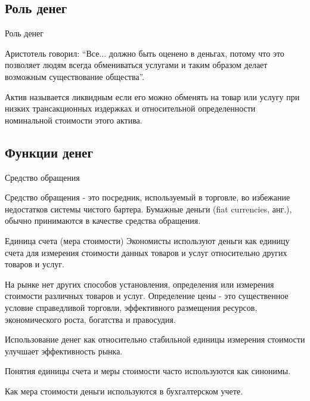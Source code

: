 \documentclass[_DKB_p1_Money.tex]{subfiles}
\begin{document}
\subsection{Роль денег}
\begin{frame}{Роль денег}
\begin{block}
\quad
Аристотель говорил: ``Все... должно быть оценено в деньгах, потому что это позволяет людям всегда обмениваться услугами и таким образом делает возможным существование общества''.
\end{block}
\begin{block}{Актив называется ликвидным}
\quad
если его можно обменять на товар или услугу при низких трансакционных издержках и относительной определенности номинальной стоимости этого актива.
\end{block}
\end{frame}

\subsection{Функции денег}

\begin{frame}{}
\begin{figure}
	\centering
	\begin{overprint}
	\end{overprint}
	\vspace*{-1.5em}
	\caption{}
\end{figure}
\end{frame}


\begin{frame}{Средство обращения }
\begin{block}{Средство обращения }
\quad
- это посредник, используемый в торговле, во избежание недостатков системы чистого бартера. Бумажные деньги (fiat currencies, анг.), обычно принимаются в качестве средства обращения. 
\end{block}
\end{frame}

\begin{frame}[shrink=10]{Единица счета (мера стоимости) }
Экономисты используют деньги как единицу счета для измерения стоимости данных товаров и услуг относительно других товаров и услуг.

На рынке нет других способов установления, определения или измерения стоимости различных товаров и услуг. Определение цены - это существенное условие справедливой торговли, эффективного размещения ресурсов, экономического роста, богатства и правосудия.

Использование денег как относительно стабильной единицы измерения стоимости улучшает эффективность рынка.

Понятия единицы счета и меры стоимости часто используются как синонимы.

Как мера стоимости деньги используются в бухгалтерском учете. 
\end{frame}
\end{document}

